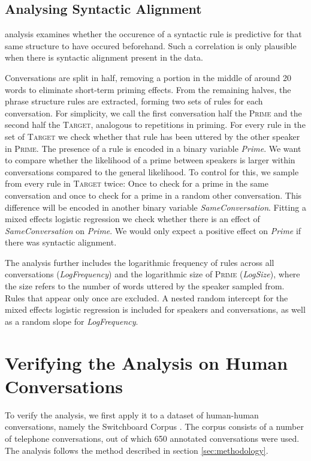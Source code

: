 \documentclass[11pt]{article}
\begin{document}
\subsection{Analysing Syntactic Alignment}

 analysis examines whether the occurence of a syntactic rule is predictive for that same structure to have occured beforehand. Such a correlation is only plausible when there is syntactic alignment present in the data.

Conversations are split in half, removing a portion in the middle of around 20 words to eliminate short-term priming effects. From the remaining halves, the phrase structure rules are extracted, forming two sets of rules for each conversation. For simplicity, we call the first conversation half the \textsc{Prime} and the second half the \textsc{Target}, analogous to repetitions in priming. For every rule in the set of \textsc{Target} we check whether that rule has been uttered by the other speaker in \textsc{Prime}. The presence of a rule is encoded in a binary variable \textit{Prime}. We want to compare whether the likelihood of a prime between speakers is larger within conversations compared to the general likelihood. To control for this, we sample from every rule in \textsc{Target} twice: Once to check for a prime in the same conversation and once to check for a prime in a random other conversation. This difference will be encoded in another binary variable \textit{SameConversation}. Fitting a mixed effects logistic regression we check whether there is an effect of \textit{SameConversation} on \textit{Prime}. We would only expect a positive effect on \textit{Prime} if there was syntactic alignment.

The analysis further includes the logarithmic frequency of rules across all conversations (\textit{LogFrequency}) and the logarithmic size of \textsc{Prime} (\textit{LogSize}), where the size refers to the number of words uttered by the speaker sampled from. Rules that appear only once are excluded. A nested random intercept for the mixed effects logistic regression is included for speakers and conversations, as well as a random slope for \textit{LogFrequency}.

\section{Verifying the Analysis on Human Conversations}
To verify the analysis, we first apply it to a dataset of human-human conversations, namely the Switchboard Corpus \cite{marcus1994penn}. The corpus consists of a number of telephone conversations, out of which 650 annotated conversations were used. The analysis follows the method described in section \ref{sec:methodology}.
\end{document}
